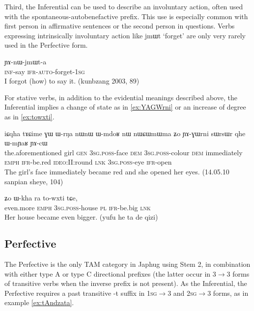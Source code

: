 \documentclass[oldfontcommands,oneside,a4paper,11pt]{article}
\newcommand{\ipa}[1]{{\phon \mbox{#1}}} %
\begin{document}
Third, the Inferential can be used to describe an involuntary action, often used with the spontaneous-autobenefactive prefix. This use is especially common with first person in affirmative sentences or the second person in questions. Verbs expressing intrinsically involuntary action like \ipa{jmɯt} `forget' are only very rarely used in the Perfective form.

\begin{exe}
\ex 
\gll \ipa{kɤ-ti} \ipa{ɲɤ-nɯ-jmɯt-a} \\
\textsc{inf}-say  \textsc{ifr-auto}-forget-\textsc{1sg} \\
\glt I forgot (how) to say it. (kunbzang 2003, 89)
\end{exe}

For stative verbs, in addition to the evidential meanings described above, the Inferential implies a change of state as in \ref{ex:YAGWrni} or an increase of degree as in \ref{ex:towxti}.


\begin{exe}
\ex \label{ex:YAGWrni}
\gll 
\ipa{iɕqha} 	\ipa{tɤɕime} 	\ipa{ɣɯ} 	\ipa{ɯ-rŋa} 	\ipa{nɯnɯ} 	\ipa{ɯ-mdoʁ} 	\ipa{nɯ} 	\ipa{nɯɕɯmɯma} 	\ipa{ʑo} 	\ipa{ɲɤ-ɣɯrni} 	\ipa{sɯrsɯr} 	\ipa{qhe} 	\ipa{ɯ-mɲaʁ} 	\ipa{ɲɤ-cɯ}\\
the.aforementioned girl \textsc{gen} \textsc{3sg.poss}-face \textsc{dem} \textsc{3sg.poss}-colour \textsc{dem} immediately \textsc{emph} \textsc{ifr}-be.red \textsc{ideo}:II:round \textsc{lnk} \textsc{3sg.poss}-eye \textsc{ifr}-open \\
\glt The girl's face immediately became red and she opened her eyes. (14.05.10 sanpian sheye, 104)
\end{exe}

\begin{exe}
\ex \label{ex:towxti}
\gll \ipa{mɤʑɯ} 	\ipa{ʑo} 	\ipa{ɯ-kha} 	\ipa{ra} 	\ipa{to-wxti} 	\ipa{tɕe,} \\
even.more \textsc{emph} \textsc{3sg.poss}-house \textsc{pl} \textsc{ifr}-be.big \textsc{lnk} \\
\glt Her house became even bigger. (yufu he ta de qizi)
\end{exe}



\subsection{Perfective}  \label{sec:pfv}
The Perfective is the only TAM category in Japhug using Stem 2, in combination with either type A or type C directional prefixes (the latter occur in 3$\rightarrow$3 forms of transitive verbs when the inverse prefix is not present). As the Inferential, the Perfective requires a past transitive \ipa{-t} suffix in  \textsc{1sg}$\rightarrow$3 and \textsc{2sg}$\rightarrow$3 forms, as in example \ref{ex:tAndzata}.
\end{document}
